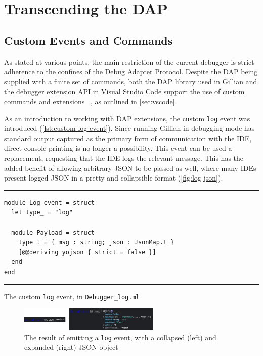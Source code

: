 
\section{Transcending the DAP}

\subsection{Custom Events and Commands}

As stated at various points, the main restriction of the current debugger is
strict adherence to the confines of the Debug Adapter Protocol. Despite the DAP
being supplied with a finite set of commands, both the DAP library used in
Gillian and the debugger extension API in Visual Studio Code support the use of
custom commands and extensions%
~\cite{ocaml-dap-custom, vscode-dap-custom-event, vscode-dap-custom-request}, as
outlined in \autoref{sec:vscode}.

As an introduction to working with DAP extensions, the custom \texttt{log} event
was introduced (\autoref{lst:custom-log-event}). Since running Gillian in
debugging mode has standard output captured as the primary form of communication
with the IDE, direct console printing is no longer a possibility. This event
can be used a replacement, requesting that the IDE logs the relevant message.
This has the added benefit of allowing arbitrary JSON to be passed as well,
where many IDEs present logged JSON in a pretty and collapsible format
(\autoref{fig:log-json}).

\begin{listing}[!ht]
\noindent\rule{\textwidth}{0.5pt}
\vspace{-0.6cm}
\begin{verbatim}
module Log_event = struct
  let type_ = "log"

  module Payload = struct
    type t = { msg : string; json : JsonMap.t }
    [@@deriving yojson { strict = false }]
  end
end
\end{verbatim}
\vspace{-0.4cm}
\noindent\rule{\textwidth}{0.5pt}
\vspace{-0.6cm}
\caption{The custom \texttt{log} event, in \texttt{Debugger\_log.ml}}
\label{lst:custom-log-event}
\end{listing}

\begin{figure}
  \center{}
  \includegraphics[width=0.6\textwidth]{img/log-json.png}
  \caption{
    The result of emitting a \texttt{log} event, with a collapsed (left) and
    expanded (right) JSON object}%
  \label{fig:log-json}
\end{figure}


